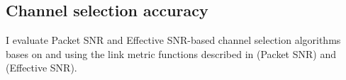 %
%
%

\subsection{Channel selection accuracy}
I evaluate Packet SNR and Effective SNR-based channel selection algorithms bases on  and using the link metric functions described in  (Packet SNR) and  (Effective SNR).

